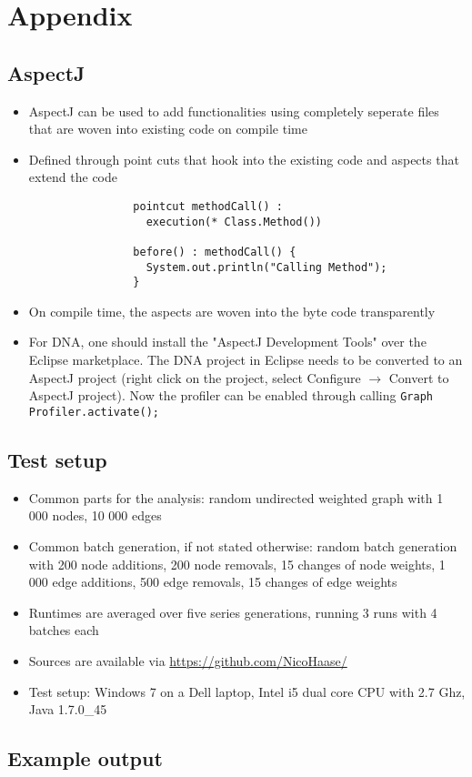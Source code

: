 \section{Appendix}
\subsection{AspectJ} \label{sec:aspectj}
	\begin{itemize}
		\item AspectJ can be used to add functionalities using completely
			seperate files that are woven into existing code on compile time
		\item Defined through point cuts that hook into the existing code and aspects that
			extend the code
	
			\begin{verbatim}
				pointcut methodCall() :
				  execution(* Class.Method())
				  
				before() : methodCall() {
				  System.out.println("Calling Method");
				}
			\end{verbatim}
		
		\item On compile time, the aspects are woven into the byte code transparently
		\item For DNA, one should install the "AspectJ Development Tools" over the Eclipse
			marketplace. The DNA project in Eclipse needs to be converted to an AspectJ project
			(right click on the project, select Configure $\rightarrow$ Convert to AspectJ
			project). Now the profiler can be enabled through calling \texttt{Graph\allowbreak
			Profiler.\allowbreak activate();}
		
	\end{itemize}
\subsection{Test setup} \label{sec:testSetup}
	\begin{itemize}
		\item Common parts for the analysis: random undirected weighted graph with 1 000 nodes,
			10 000 edges
		\item Common batch generation, if not stated otherwise: random batch generation with 200
			node additions, 200 node removals, 15 changes of node weights, 1 000 edge additions,
			500 edge removals, 15 changes of edge weights
		\item Runtimes are averaged over five series generations, running 3 runs with 4 batches
			each
		\item Sources are available via \url{https://github.com/NicoHaase/}
		\item Test setup: Windows 7 on a Dell laptop, Intel i5 dual core CPU with 2.7 Ghz, Java
			1.7.0\_45
	\end{itemize}
	
\subsection{Example output} \label{sec:exampleOutput}
	